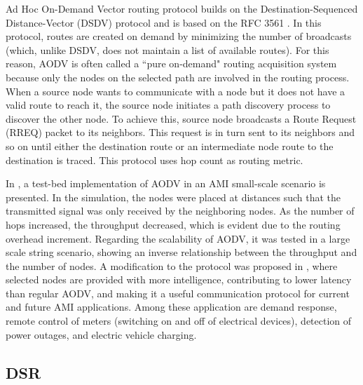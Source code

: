 \documentclass[10pt,twocolumn,twoside,submit]{JCNtran}
\begin{document}
Ad Hoc On-Demand Vector routing protocol builds on the Destination-Sequenced Distance-Vector (DSDV) protocol and is based on the RFC 3561 \cite{Perkins2003}. In this protocol, routes are created on demand by minimizing the number of broadcasts (which, unlike DSDV, does not maintain a list of available routes). For this reason, AODV is often called a ``pure on-demand" routing acquisition system because only the nodes on the selected path are involved in the routing process. When a source node wants to communicate with a node but it does not have a valid route to reach it, the source node initiates a path discovery process to discover the other node. To achieve this, source node broadcasts a Route Request (RREQ) packet to its neighbors. This request is in turn sent to its neighbors and so on until either the destination route or an intermediate node route to the destination is traced. This protocol uses hop count as routing metric.

In \cite{Toimoor2013}, a test-bed implementation of AODV in an AMI small-scale scenario is presented. In the simulation, the nodes were placed at distances such that the transmitted signal was only received by the neighboring nodes. As the number of hops increased, the throughput decreased, which is evident due to the routing overhead increment. Regarding the scalability of AODV, it was tested in a large scale string scenario, showing an inverse relationship between the throughput and the number of nodes. A modification to the protocol was proposed in \cite{Toimoor2013}, where selected nodes are provided with more intelligence, contributing to lower latency than regular AODV, and making it a useful communication protocol for current and future AMI applications. Among these application are demand response, remote control of meters (switching on and off of electrical devices), detection of power outages, and electric vehicle charging. 


\subsection{DSR}\label{dsr}
\end{document}
